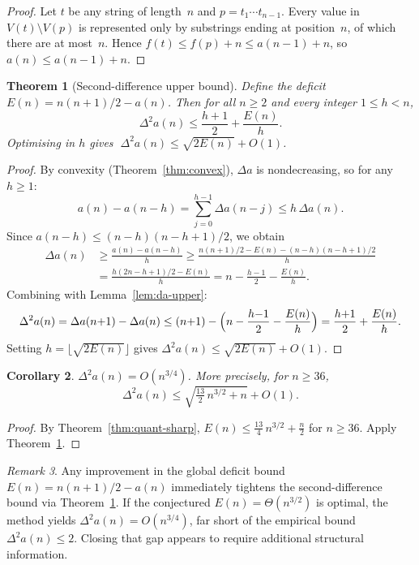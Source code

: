 \documentclass[11pt,a4paper]{article}
\theoremstyle{plain}
\newtheorem{theorem}{Theorem}[section]
\newtheorem{corollary}[theorem]{Corollary}
\theoremstyle{definition}
\theoremstyle{remark}
\newtheorem{remark}[theorem]{Remark}
\newcommand{\Da}{\Delta a}
\newcommand{\DDa}{\Delta^2 a}
\begin{document}
\begin{proof}
  Let $t$ be any string of length~$n$ and $p = t_1 \cdots t_{n-1}$.
  Every value in $V(t) \setminus V(p)$ is represented only by
  substrings ending at position~$n$, of which there are at most~$n$.
  Hence $f(t) \le f(p) + n \le a(n{-}1) + n$, so
  $a(n) \le a(n{-}1) + n$.
\end{proof}

\begin{theorem}[Second-difference upper bound]\label{thm:dda-upper}
  Define the \emph{deficit} $E(n) = n(n{+}1)/2 - a(n)$.  Then for
  all $n \ge 2$ and every integer $1 \le h < n$,
  \[
    \DDa(n) \le \frac{h{+}1}{2} + \frac{E(n)}{h}.
  \]
  Optimising in $h$ gives
  $\;\DDa(n) \le \sqrt{2E(n)} + O(1)$.
\end{theorem}

\begin{proof}
  By convexity (Theorem~\ref{thm:convex}), $\Da$ is nondecreasing,
  so for any $h \ge 1$:
  \[
    a(n) - a(n{-}h) = \sum_{j=0}^{h-1} \Da(n{-}j) \le h\,\Da(n).
  \]
  Since $a(n{-}h) \le (n{-}h)(n{-}h{+}1)/2$, we obtain
  \begin{align*}
    \Da(n) &\ge \frac{a(n) - a(n{-}h)}{h}
    \ge \frac{n(n{+}1)/2 - E(n) - (n{-}h)(n{-}h{+}1)/2}{h} \\
    &= \frac{h(2n{-}h{+}1)/2 - E(n)}{h}
    = n - \frac{h{-}1}{2} - \frac{E(n)}{h}.
  \end{align*}
  Combining with Lemma~\ref{lem:da-upper}:
  \[
    \DDa(n) = \Da(n{+}1) - \Da(n)
    \le (n{+}1) - \Bigl(n - \frac{h{-}1}{2} - \frac{E(n)}{h}\Bigr)
    = \frac{h{+}1}{2} + \frac{E(n)}{h}.
  \]
  Setting $h = \lfloor \sqrt{2E(n)} \rfloor$ gives
  $\DDa(n) \le \sqrt{2E(n)} + O(1)$.
\end{proof}

\begin{corollary}\label{cor:dda-sublinear}
  $\DDa(n) = O(n^{3/4})$.  More precisely, for $n \ge 36$,
  \[
    \DDa(n) \le \sqrt{\tfrac{13}{2}\,n^{3/2} + n} + O(1).
  \]
\end{corollary}

\begin{proof}
  By Theorem~\ref{thm:quant-sharp},
  $E(n) \le \tfrac{13}{4}\,n^{3/2} + \tfrac{n}{2}$ for $n \ge 36$.
  Apply Theorem~\ref{thm:dda-upper}.
\end{proof}

\begin{remark}
  Any improvement in the global deficit bound
  $E(n) = n(n{+}1)/2 - a(n)$ immediately tightens the second-difference
  bound via Theorem~\ref{thm:dda-upper}.  If the conjectured
  $E(n) = \Theta(n^{3/2})$ is optimal, the method yields
  $\DDa(n) = O(n^{3/4})$, far short of the empirical bound
  $\DDa(n) \le 2$.  Closing that gap appears to require additional
  structural information.
\end{remark}
\end{document}
